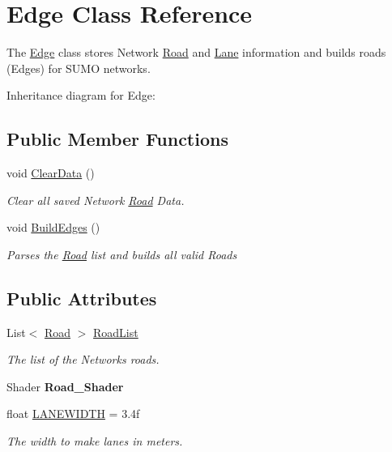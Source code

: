 \hypertarget{class_edge}{}\section{Edge Class Reference}
\label{class_edge}


The \mbox{\hyperlink{class_edge}{Edge}} class stores Network \mbox{\hyperlink{struct_road}{Road}} and \mbox{\hyperlink{struct_lane}{Lane}} information and builds roads (Edges) for S\+U\+MO networks.  


Inheritance diagram for Edge\+:\begin{figure}[H]
\begin{center}
\leavevmode
\end{center}
\end{figure}
\subsection*{Public Member Functions}
\begin{DoxyCompactItemize}
\item 
void \mbox{\hyperlink{class_edge_a2ec64470c2a869696dfba6b5fdd9cf0b}{Clear\+Data}} ()
\begin{DoxyCompactList}\small\item\em Clear all saved Network \mbox{\hyperlink{struct_road}{Road}} Data. \end{DoxyCompactList}\item 
void \mbox{\hyperlink{class_edge_af671777176dc831d8a08e49f032fc763}{Build\+Edges}} ()
\begin{DoxyCompactList}\small\item\em Parses the \mbox{\hyperlink{struct_road}{Road}} list and builds all valid Roads \end{DoxyCompactList}\end{DoxyCompactItemize}
\subsection*{Public Attributes}
\begin{DoxyCompactItemize}
\item 
List$<$ \mbox{\hyperlink{struct_road}{Road}} $>$ \mbox{\hyperlink{class_edge_ada376fd8a81711e44ab425c32a85e844}{Road\+List}}
\begin{DoxyCompactList}\small\item\em The list of the Networks roads. \end{DoxyCompactList}\item 
\mbox{\label{class_edge_a63c171b9e0912dcc3c03e85881a64b42}} 
Shader {\bfseries Road\+\_\+\+Shader}
\item 
float \mbox{\hyperlink{class_edge_abce1274185524bbf90f49b8214130fd1}{L\+A\+N\+E\+W\+I\+D\+TH}} = 3.\+4f
\begin{DoxyCompactList}\small\item\em The width to make lanes in meters. \end{DoxyCompactList}\end{DoxyCompactItemize}



